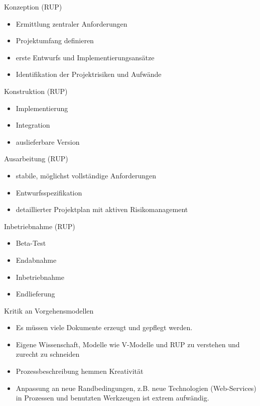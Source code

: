 \begin{bonus}{Konzeption (RUP)}
    \begin{itemize}
        \item Ermittlung zentraler Anforderungen
        \item Projektumfang definieren
        \item erste Entwurfs und Implementierungsansätze
        \item Identifikation der Projektrisiken und Aufwände
    \end{itemize}
\end{bonus}

\begin{bonus}{Konstruktion (RUP)}
    \begin{itemize}
        \item Implementierung
        \item Integration
        \item auslieferbare Version
    \end{itemize}
\end{bonus}

\begin{bonus}{Ausarbeitung (RUP)}
    \begin{itemize}
        \item stabile, möglichst vollständige Anforderungen
        \item Entwurfsspezifikation
        \item detaillierter Projektplan mit aktiven Risikomanagement
    \end{itemize}
\end{bonus}

\begin{bonus}{Inbetriebnahme (RUP)}
    \begin{itemize}
        \item Beta-Test
        \item Endabnahme
        \item Inbetriebnahme
        \item Endlieferung
    \end{itemize}
\end{bonus}


\begin{bonus}{Kritik an Vorgehensmodellen}
    \begin{itemize}
        \item Es müssen viele Dokumente erzeugt und gepflegt werden.
        \item Eigene Wissenschaft, Modelle wie V-Modelle und RUP zu verstehen und zurecht zu schneiden
        \item Prozessbeschreibung hemmen Kreativität
        \item Anpassung an neue Randbedingungen, z.B. neue Technologien (Web-Services) in Prozessen und benutzten Werkzeugen ist extrem aufwändig.
    \end{itemize}
\end{bonus}

